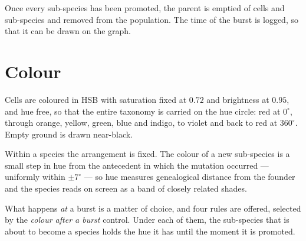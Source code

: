 \documentclass[11pt,a4paper]{article}
\begin{document}
Once every sub-species has been promoted, the parent is emptied of cells and sub-species
and removed from the population. The time of the burst is logged, so that it can be
drawn on the graph.

\section{Colour}
\label{sec:colour}

Cells are coloured in HSB with saturation fixed at $0.72$ and brightness at $0.95$, and
hue free, so that the entire taxonomy is carried on the hue circle: red at $0^\circ$,
through orange, yellow, green, blue and indigo, to violet and back to red at $360^\circ$.
Empty ground is drawn near-black.

Within a species the arrangement is fixed. The colour of a new
sub-species is a small step in hue from the antecedent in which the mutation occurred ---
uniformly within $\pm 7^{\circ}$ --- so hue measures genealogical distance from the
founder and the species reads on screen as a band of closely related shades.

What happens \emph{at} a burst is a matter of choice, and four rules are offered, selected
by the \emph{colour after a burst} control. Under each of them, the sub-species that is
about to become a species holds the hue it has until the moment it is promoted.
\end{document}
